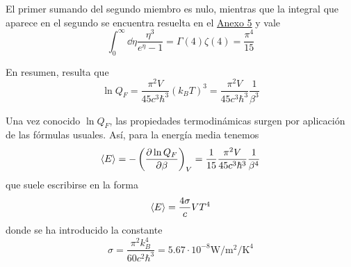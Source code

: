 El primer sumando del segundo miembro es nulo, mientras que la integral que aparece en el segundo se encuentra resuelta en el \hyperref[Anx5]{Anexo 5} y vale
\begin{equation}
	\int_0^\infty \dd{\eta} \frac{\eta^3}{e^{\eta} - 1} = \Gamma(4)\zeta(4) = \frac{\pi^4}{15}
\end{equation}

En resumen, resulta que
\begin{equation}
	\ln Q_F = \frac{\pi^2 V}{45 c^3 \hbar^3} (k_B T)^3 = \frac{\pi^2 V}{45 c^3 \hbar^3} \frac{1}{\beta^3}
\end{equation}

Una vez conocido $\ln Q_F$, las propiedades termodinámicas surgen por aplicación de las fórmulas usuales.
Así, para la energía media tenemos
\begin{equation}
	\expval{E} = - \left( \pdv{\ln Q_F}{\beta} \right)_V = \frac{1}{15} \frac{\pi^2 V}{45 c^3 \hbar^3} \frac{1}{\beta^4}
\end{equation}
que suele escribirse en la forma
\begin{equation}
	\expval{E} =  \frac{4\sigma}{c} V T^4
\end{equation}
donde se ha introducido la constante
\begin{equation}
	\sigma = \frac{\pi^2 k_B^4}{60 c^2 \hbar^3} = 5.67 \cdot 10^{-8} \si{\watt\per\square\m\per\kelvin\tothe{4}}
\end{equation}
